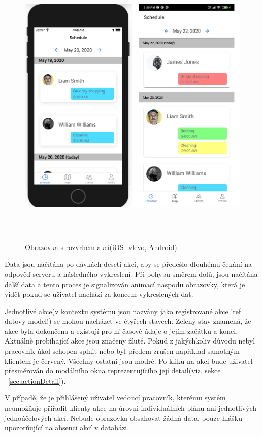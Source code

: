 \documentclass[
  biblatex,
  glossaries,
  index
]{kidiplom}
\begin{document}
\begin{figure}[H]
  	\centering
 	 \includegraphics[width=14cm,height=14cm,keepaspectratio]{schedule_screen}
 	 \caption{Obrazovka s rozvrhem akcí(iOS- vlevo, Android)}
 	 \label{fig:schedule_screen}
\end{figure}

Data jsou načítána po dávkách deseti akcí, aby se předešlo dlouhému čekání na odpověď serveru a následného vykreslení. Při pohybu směrem dolů, jsou načítána další data a tento proces je signalizován animací naspodu obrazovky, která je vidět pokud se uživatel nachází za koncem vykreslených dat.

Jednotlivé akce(v kontextu systému jsou nazvány jako registrované akce !ref datovy model!) se mohou nacházet ve čtyřech stavech. Zelený stav znamená, že akce byla dokončena a existují pro ní časové údaje o jejím začátku a konci. Aktuálně probíhající akce jsou značeny žlutě. Pokud z jakýchkoliv důvodu nebyl pracovník úkol schopen splnit nebo byl předem zrušen například samotným klientem je červený. Všechny ostatní jsou modré. Po kliku na akci bude uživatel přesměrován do modálního okna reprezentujícího její detail(viz. sekce ~\ref{sec:actionDetail}).

V případě, že je přihlášený uživatel vedoucí pracovník, kterému systém neumožňuje přiřadit klienty akce na úrovni individuálních plánu ani jednotlivých jednoúčelových akcí. Nebude obrazovka obsahovat žádná data, pouze hlášku upozorňující na absenci akcí v databázi.
\end{document}
